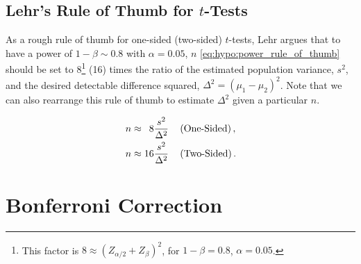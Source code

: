 
\subsection{Lehr's Rule of Thumb for \texorpdfstring{$t$}{t}-Tests}
\label{hypo:power:rule_of_thumb}

As a rough rule of thumb for one-sided (two-sided) $t$-tests,
Lehr argues that to have a power of $1-\beta \sim \num{0.8}$ with $\alpha = \num{0.05}$,
$n$ \cref{eq:hypo:power_rule_of_thumb} should be set to 8\footnote{This
factor is $8 \approx \left(Z_{\alpha/2} + Z_{\beta}\right)^{2}$, for $1-\beta = \num{0.8}$, $\alpha = \num{0.05}$.} (16)
times the ratio of the estimated population variance, $s^{2}$,
and the desired detectable difference squared, $\Delta^{2} = \left(\mu_{1} - \mu_{2}\right)^{2}$.
Note that we can also rearrange this rule of thumb to estimate $\Delta^{2}$ given a particular $n$.

\begin{subequations}\label{eq:hypo:power_rule_of_thumb}
\begin{align}
n &\approx \hphantom{1}8 \frac{s^{2}}{\Delta^{2}}\quad \left(\text{One-Sided}\right), \label{eq:hypo:power_rule_of_thumb:one} \\
n &\approx 16 \frac{s^{2}}{\Delta^{2}}\quad \left(\text{Two-Sided}\right). \label{eq:hypo:power_rule_of_thumb:two}
\end{align}
\end{subequations}

\section{Bonferroni Correction}
\label{hypo:bonferroni_correction}

